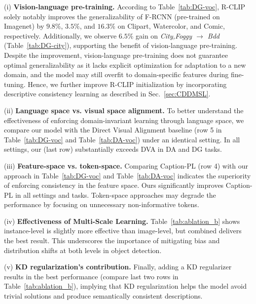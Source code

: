 (i) \textbf{Vision-language pre-training.} According to Table~\ref{tab:DG-voc}, R-CLIP solely notably improves the generalizability of F-RCNN (pre-trained on Imagenet) by $9.8\%$, $3.5\%$, and $16.3\%$ on Clipart, Watercolor, and Comic, respectively. Additionally, we observe $6.5\%$ gain on \emph{City,Foggy $\rightarrow$ Bdd} (Table~\ref{tab:DG-city}), supporting the benefit of vision-language pre-training. 
Despite the improvement, vision-language pre-training does not guarantee optimal generalizability as it lacks explicit optimization for adaptation to a new domain, and the model may still overfit to domain-specific features during fine-tuning. Hence, we further improve R-CLIP initialization by incorporating descriptive consistency learning as described in Sec.~\ref{sec:CDDMSL}.

(ii) \textbf{Language space vs. visual space alignment.}
    To better understand the effectiveness of enforcing domain-invariant learning through language space, we compare our model with the Direct Visual Alignment baseline (row 5 in Table~\ref{tab:DG-voc} and Table~\ref{tab:DA-voc}) under an identical setting. In all settings, our (last row) substantially exceeds DVA in DA and DG tasks. 

(iii) \textbf{Feature-space vs. token-space.} Comparing Caption-PL (row 4) with our approach in Table~\ref{tab:DG-voc} and Table~\ref{tab:DA-voc} indicates the superiority of enforcing consistency in the feature space. Ours significantly improves Caption-PL in all settings and tasks. Token-space approaches may degrade the performance by focusing on unnecessary non-informative tokens. 

(iv) \textbf{Effectiveness of Multi-Scale Learning.} Table~\ref{tab:ablation_b} shows instance-level is slightly more effective than image-level, but combined delivers the best result. This underscores the importance of mitigating bias and distribution shifts at both levels in object detection.

(v) \textbf{KD regularization's contribution.} Finally, adding a KD regularizer results in the best performance (compare last two rows in Table~\ref{tab:ablation_b}), implying that KD regularization helps the model avoid trivial solutions and produce semantically consistent descriptions.





